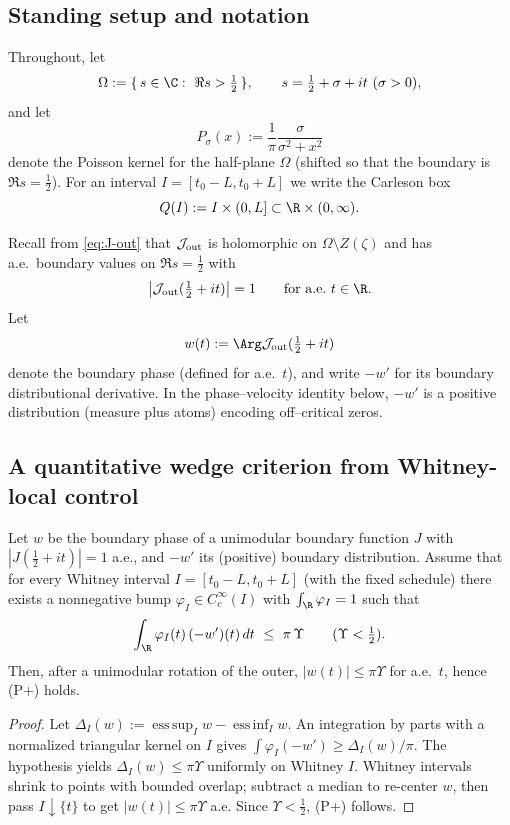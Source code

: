 
\subsection*{Standing setup and notation}
Throughout, let
\[
  \Omega:=\{\,s\in\C:\ \Re s>\tfrac12\,\},\qquad s=\tfrac12+\sigma+it\ (\sigma>0),
\]
and let
\[
  P_\sigma(x):=\frac{1}{\pi}\frac{\sigma}{\sigma^2+x^2}
\]
denote the Poisson kernel for the half-plane \(\Omega\) (shifted so that the boundary is \(\Re s=\tfrac12\)).
For an interval \(I=[t_0-L,t_0+L]\) we write the Carleson box
\[
  Q(I):=I\times(0,L]\subset \R\times(0,\infty).
\]

Recall from \eqref{eq:J-out} that \(\mathcal J_{\rm out}\) is holomorphic on \(\Omega\setminus Z(\zeta)\) and has a.e.\ boundary values on \(\Re s=\tfrac12\) with
\[
  \big|\mathcal J_{\rm out}(\tfrac12+it)\big|=1\qquad\text{for a.e.\ }t\in\R.
\]
Let
\[
  w(t):=\Arg \mathcal J_{\rm out}(\tfrac12+it)
\]
denote the boundary phase (defined for a.e.\ \(t\)), and write \(-w'\) for its boundary distributional derivative.
In the phase--velocity identity below, \(-w'\) is a positive distribution (measure plus atoms) encoding off--critical zeros.

\subsection*{A quantitative wedge criterion from Whitney-local control}
\begin{lemma}\label{lem:local-to-global-wedge}
Let \(w\) be the boundary phase of a unimodular boundary function \(J\) with \(|J(\tfrac12+it)|=1\) a.e., and \(-w'\) its (positive) boundary distribution.
Assume that for every Whitney interval \(I=[t_0-L,t_0+L]\) (with the fixed schedule) there exists a nonnegative bump \(\varphi_I\in C_c^\infty(I)\) with \(\int_\R\varphi_I=1\) such that
\[
  \int_\R \varphi_I(t)\,(-w')(t)\,dt\ \le\ \pi\,\Upsilon\qquad(\Upsilon<\tfrac12).
\]
Then, after a unimodular rotation of the outer, \(|w(t)|\le \pi\Upsilon\) for a.e.\ \(t\), hence \textup{(P+)} holds.
\end{lemma}
\begin{proof}
Let \(\Delta_I(w):=\operatorname*{ess\,sup}_I w-\operatorname*{ess\,inf}_I w\).
An integration by parts with a normalized triangular kernel on \(I\) gives \(\int \varphi_I(-w')\ge \Delta_I(w)/\pi\).
The hypothesis yields \(\Delta_I(w)\le \pi\Upsilon\) uniformly on Whitney \(I\).
Whitney intervals shrink to points with bounded overlap; subtract a median to re-center \(w\), then pass \(I\downarrow\{t\}\) to get \(|w(t)|\le\pi\Upsilon\) a.e.
Since \(\Upsilon<\tfrac12\), \textup{(P+)} follows.
\end{proof}

